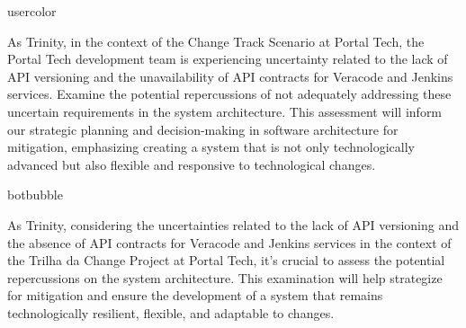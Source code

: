 \begin{chatin}{usercolor}{}

As Trinity, in the context of the Change Track Scenario at Portal Tech, the Portal Tech development team is experiencing uncertainty related to the lack of API versioning and the unavailability of API contracts for Veracode and Jenkins services. Examine the potential repercussions of not adequately addressing these uncertain requirements in the system architecture. This assessment will inform our strategic planning and decision-making in software architecture for mitigation, emphasizing creating a system that is not only technologically advanced but also flexible and responsive to technological changes.
\end{chatin}

\begin{chatout}{botbubble}{}

As Trinity, considering the uncertainties related to the lack of API versioning and the absence of API contracts for Veracode and Jenkins services in the context of the Trilha da Change Project at Portal Tech, it's crucial to assess the potential repercussions on the system architecture. This examination will help strategize for mitigation and ensure the development of a system that remains technologically resilient, flexible, and adaptable to changes. 

\newline
{}\newline
{}\newline
{}

\newline
{}\newline
{}


\end{chatout}
